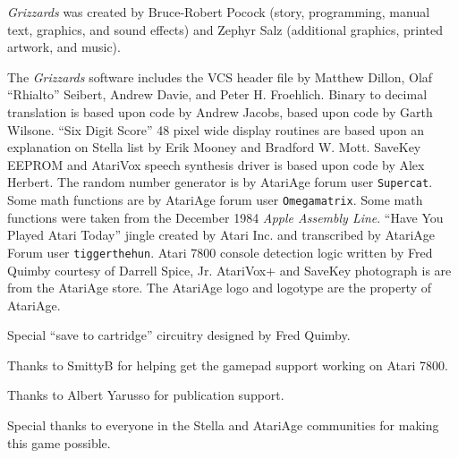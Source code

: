 \documentclass[10pt,twocolumn,openany,article]{memoir}
\begin{document}
\fi

\fi %


\vfill


\pagebreak


\textit{Grizzards}   was   created   by  Bruce-Robert   Pocock   (story,
programming, manual text,  graphics, and sound effects)  and Zephyr Salz
(additional graphics, printed artwork, and music).

The \textit{Grizzards} software includes the  VCS header file by Matthew
Dillon, Olaf ``Rhialto'' Seibert, Andrew  Davie, and Peter H. Froehlich.
Binary to decimal translation is based upon code by Andrew Jacobs, based
upon code  by Garth Wilsone. ``Six  Digit Score'' 48 pixel  wide display
routines are based upon an explanation on Stella list by Erik Mooney and
Bradford W. Mott. \ifdefined\ATARIAGESAVE\else  SaveKey EEPROM and \fi{}
AtariVox speech  synthesis driver  is based upon  code by  Alex Herbert.
The random number generator is by AtariAge forum user \texttt{Supercat}.
Some math  functions are by AtariAge  forum user \texttt{Omega\-matrix}.
Some  math functions  were taken  from the  December 1984  \textit{Apple
  Assembly  Line}. ``Have  You Played  Atari Today''  jingle created  by
Atari    Inc.     and    transcribed    by    AtariAge     Forum    user
\texttt{tigger\-the\-hun}. Atari 7800 console detection logic written by
Fred    Quimby    courtesy    of   Darrell    Spice,    Jr.    AtariVox+
\ifdefined\ATARIAGESAVE\else          and         SaveKey          \fi{}
photograph\ifdefined\ATARIAGESAVE{}  is    are  \fi{}  from  the
AtariAge store.  \ifdefined\ATARIAGESAVE The AtariAge logo  and logotype
are the property of AtariAge. \fi

Special ``save to cartridge'' circuitry designed by Fred Quimby.

Thanks  to  SmittyB for  helping  get  the  gamepad support  working  on
Atari 7800.

Thanks to Albert Yarusso for publication support.

Special thanks  to everyone in  the Stella and AtariAge  communities for
making this game possible.

\vspace{30pt}
\end{document}
